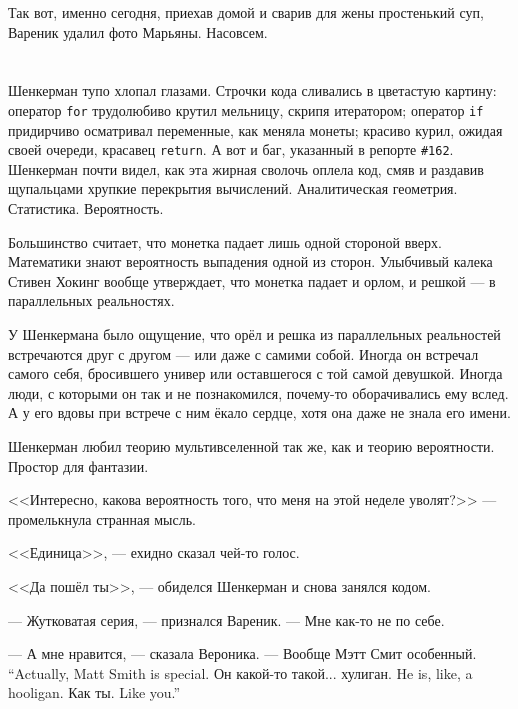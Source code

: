 Так вот, именно сегодня, приехав домой и сварив для жены простенький суп, Вареник удалил фото Марьяны.
Насовсем.

\chapter{}

\textspace

Шенкерман тупо хлопал глазами.
Строчки кода сливались в цветастую картину: оператор \texttt{\small{for}} трудолюбиво крутил мельницу, скрипя итератором;
оператор \texttt{\small{if}} придирчиво осматривал переменные, как меняла монеты;
красиво курил, ожидая своей очереди, красавец \texttt{\small{return}}.
А вот и баг, указанный в репорте \texttt{\small{\#162}}.
Шенкерман почти видел, как эта жирная сволочь оплела код, смяв и раздавив щупальцами хрупкие перекрытия вычислений.
Аналитическая геометрия.
Статистика.
Вероятность.

Большинство считает, что монетка падает лишь одной стороной вверх.
Математики знают вероятность выпадения одной из сторон.
Улыбчивый калека Стивен Хокинг вообще утверждает, что монетка падает и орлом, и решкой --- в параллельных реальностях.

У Шенкермана было ощущение, что орёл и решка из параллельных реальностей встречаются друг с другом --- или даже с самими собой.
Иногда он встречал самого себя, бросившего универ или оставшегося с той самой девушкой.
Иногда люди, с которыми он так и не познакомился, почему-то оборачивались ему вслед.
А у его вдовы при встрече с ним ёкало сердце, хотя она даже не знала его имени.

Шенкерман любил теорию мультивселенной так же, как и теорию вероятности.
Простор для фантазии.

<<Интересно, какова вероятность того, что меня на этой неделе уволят?>> --- промелькнула странная мысль.

<<Единица>>, --- ехидно сказал чей-то голос.

<<Да пошёл ты>>, --- обиделся Шенкерман и снова занялся кодом.

\asterism

\textspace

--- Жутковатая серия, --- признался Вареник.
--- Мне как-то не по себе.

--- А мне нравится, --- сказала Вероника.
{--- Вообще Мэтт Смит особенный.}
{``Actually, Matt Smith is special.}
{Он какой-то такой... хулиган.}
{He is, like, a hooligan.}
{Как ты.}
{Like you.''}

